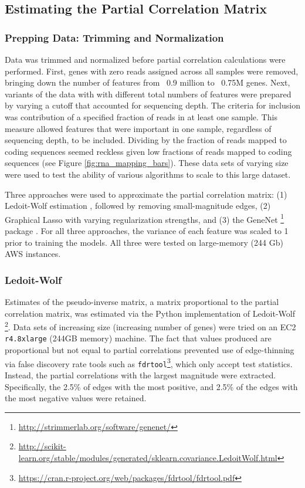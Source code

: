 \subsection{Estimating the Partial Correlation Matrix}

\subsubsection{Prepping Data: Trimming and Normalization}
Data was trimmed and normalized before partial correlation calculations were performed.
First, genes with zero reads assigned across all samples were removed, bringing down the number of features from ~0.9 million to ~0.75M genes. %
Next, variants of the data with with different total numbers of features were prepared by varying a cutoff that accounted for sequencing depth. 
The criteria for inclusion was contribution of a specified fraction of reads in at least one sample.
This measure allowed features that were important in one sample, regardless of sequencing depth, to be included.
Dividing by the fraction of reads mapped to coding sequences seemed reckless given low fractions of reads mapped to coding sequences (see Figure \ref{fig:rna_mapping_bars}).
These data sets of varying size were used to test the ability of various algorithms to scale to this large dataset.

Three approaches were used to approximate the partial correlation matrix: (1) Ledoit-Wolf estimation \cite{ledoit2003}, followed by removing small-magnitude edges, (2) Graphical Lasso \cite{friedman2008} with varying regularization strengths, and (3) the GeneNet \footnote{\url{http://strimmerlab.org/software/genenet/}} package \cite{schafer2001, schafer2005}.
For all three approaches, the variance of each feature was scaled to 1 prior to training the models.
All three were tested on large-memory (244 Gb) AWS instances.

\subsubsection{Ledoit-Wolf}
Estimates of the pseudo-inverse matrix, a matrix proportional to the partial correlation matrix, was estimated via the Python implementation of Ledoit-Wolf \footnote{\url{http://scikit-learn.org/stable/modules/generated/sklearn.covariance.LedoitWolf.html}}.
Data sets of increasing size (increasing number of genes) were tried on an EC2 \texttt{r4.8xlarge} (244GB memory) machine.
The fact that values produced are proportional but not equal to partial correlations prevented use of edge-thinning via false discovery rate tools such as \texttt{fdrtool}\footnote{\url{https://cran.r-project.org/web/packages/fdrtool/fdrtool.pdf}}, which only accept test statistics.
Instead, the partial correlations with the largest magnitude were extracted.
Specifically, the 2.5\% of edges with the most positive, and 2.5\% of the edges with the most negative values were retained.


